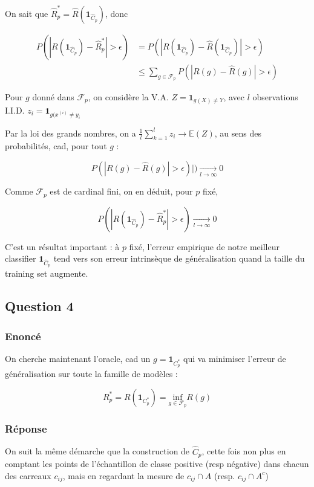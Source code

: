 \documentclass[french]{article}
\begin{document}
On sait que $ \hat{R}^{*}_{p} = \hat{R}(\mathbf{1}_{\hat{C}_{p}})$, donc

\begin{align}
P(|R(\mathbf{1}_{\hat{C}_{p}}) - \hat{R}^{*}_{p}| > \epsilon) &=
P(|R(\mathbf{1}_{\hat{C}_{p}}) - \hat{R}(\mathbf{1}_{\hat{C}_{p}})| > \epsilon) \\
&\leq \sum_{g \in \mathcal{F}_{p}} P(|R(g) - \hat{R}(g)| > \epsilon)
\end{align}

Pour $g$ donné dans $\mathcal{F}_{p}$, on considère la V.A. $ Z = \mathbf{1}_{g(X) \neq Y}$, avec $l$ observations I.I.D. $z_{i} = \mathbf{1}_{g(x^{(i)} \neq y_{i}}$

Par la loi des grands nombres, on a $ \frac{1}{l}\sum_{k=1}^{l} z_{i} \rightarrow \mathbb{E}(Z)$, au sens des probabilités, cad, pour tout $g$ :

\[
P(|R(g)-\hat{R}(g)|>\epsilon)|) 
\underset{l \rightarrow \infty}{\longrightarrow} 0
\]

Comme $\mathcal{F}_{p}$ est de cardinal fini, on en déduit, pour $p$ fixé,

\[
P(|R(\mathbf{1}_{\hat{C}_{p}}) - \hat{R}^{*}_{p}| > \epsilon) \underset{l \rightarrow \infty}{\longrightarrow} 0
\]
 
C'est un résultat important : à $p$ fixé, l'erreur empirique de notre meilleur classifier $\mathbf{1}_{\hat{C}_{p}}$ tend vers son erreur intrinsèque de généralisation quand la taille du training set augmente.


\subsection{Question 4}

\subsubsection{Enoncé}

On cherche maintenant l'oracle, cad un $g = \mathbf{1}_{C^{*}_{p}}$ qui va minimiser l'erreur de généralisation sur toute la famille de modèles :

\[
R^{*}_{p} = R(\mathbf{1}_{C^{*}_{p}}) = \underset{g \in \mathcal{F}_{p}}{\mathrm{inf}}R(g)
\]

\subsubsection{Réponse}

On suit la même démarche que la construction de $\hat{C}_{p}$, cette fois non plus en comptant les points de l'échantillon de classe positive (resp négative) dans chacun des carreaux $c_{ij}$, mais en regardant la mesure de $c_{ij} \cap A$ (resp. $c_{ij} \cap A^{c}$)
\end{document}
